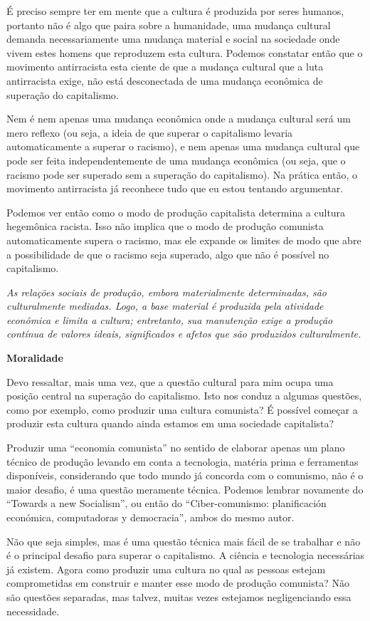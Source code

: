 É preciso sempre ter em mente que a cultura é produzida por seres humanos, portanto não é algo que paira sobre a humanidade, uma mudança cultural demanda necessariamente uma mudança material e social na sociedade onde vivem estes homens que reproduzem esta cultura. Podemos constatar então que o movimento antirracista esta ciente de que a mudança cultural que a luta antirracista exige, não está desconectada de uma mudança econômica de superação do capitalismo.

Nem é nem apenas uma mudança econômica onde a mudança cultural será um mero reflexo (ou seja, a ideia de que superar o capitalismo levaria automaticamente a superar o racismo), e nem apenas uma mudança cultural que pode ser feita independentemente de uma mudança econômica (ou seja, que o racismo pode ser superado sem a superação do capitalismo). Na prática então, o movimento antirracista já reconhece tudo que eu estou tentando argumentar.

Podemos ver então como o modo de produção capitalista determina a cultura hegemônica racista. Isso não implica que o modo de produção comunista automaticamente supera o racismo, mas ele expande os limites de modo que abre a possibilidade de que o racismo seja superado, algo que não é possível no capitalismo.

\textit{As relações sociais de produção, embora materialmente determinadas, são culturalmente mediadas. Logo, a base material é produzida pela atividade econômica e limita a cultura; entretanto, sua manutenção exige a produção contínua de valores ideais, significados e afetos que são produzidos culturalmente.}

\textbf{Moralidade}

Devo ressaltar, mais uma vez, que a questão cultural para mim ocupa uma posição central na superação do capitalismo. Isto nos conduz a algumas questões, como por exemplo, como produzir uma cultura comunista? É possível começar a produzir esta cultura quando ainda estamos em uma sociedade capitalista?

Produzir uma “economia comunista” no sentido de elaborar apenas um plano técnico de produção levando em conta a tecnologia, matéria prima e ferramentas disponíveis, considerando que todo mundo já concorda com o comunismo, não é o maior desafio, é uma questão meramente técnica. Podemos lembrar novamente do “Towards a new Socialism”, ou então do “Ciber-comunismo: planificación económica, computadoras y democracia”, ambos do mesmo autor.

Não que seja simples, mas é uma questão técnica mais fácil de se trabalhar e não é o principal desafio para superar o capitalismo. A ciência e tecnologia necessárias já existem. Agora como produzir uma cultura no qual as pessoas estejam comprometidas em construir e manter esse modo de produção comunista? Não são questões separadas, mas talvez, muitas vezes estejamos negligenciando essa necessidade.

